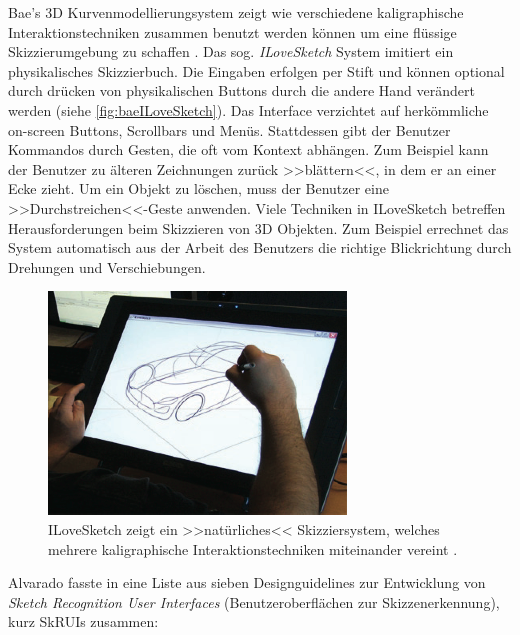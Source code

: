 \medskip Bae's 3D Kurvenmodellierungsystem zeigt wie verschiedene kaligraphische Interaktionstechniken zusammen benutzt werden können um eine flüssige Skizzierumgebung zu schaffen \citep{Bae:2008}. Das sog. \emph{ILoveSketch} System imitiert ein physikalisches Skizzierbuch. Die Eingaben erfolgen per Stift und können optional durch drücken von physikalischen Buttons durch die andere Hand verändert werden (siehe \autoref{fig:baeILoveSketch}). Das Interface verzichtet auf herkömmliche on-screen Buttons, Scrollbars und Menüs. Stattdessen gibt der Benutzer Kommandos durch Gesten, die oft vom Kontext abhängen. Zum Beispiel kann der Benutzer zu älteren Zeichnungen zurück >>blättern<<, in dem er an einer Ecke zieht. Um ein Objekt zu löschen, muss der Benutzer eine >>Durchstreichen<<-Geste anwenden. Viele Techniken in ILoveSketch betreffen Herausforderungen beim Skizzieren von 3D Objekten. Zum Beispiel errechnet das System automatisch aus der Arbeit des Benutzers die richtige Blickrichtung durch Drehungen und Verschiebungen.

\begin{figure}[bth]
	\begin{center}
	
	\includegraphics[width=0.7\linewidth]{gfx/baeILoveSketch}
	\caption[ILoveSketch]{ILoveSketch zeigt ein >>natürliches<< Skizziersystem, welches mehrere kaligraphische Interaktionstechniken miteinander vereint \citep{Bae:2008}.}
	\label{fig:baeILoveSketch}
	\end{center}
\end{figure}

Alvarado fasste in \citep{Alvorado:2004} eine Liste aus sieben Designguidelines zur Entwicklung von \emph{Sketch Recognition User Interfaces} (Benutzeroberflächen zur Skizzenerkennung), kurz SkRUIs zusammen: 

